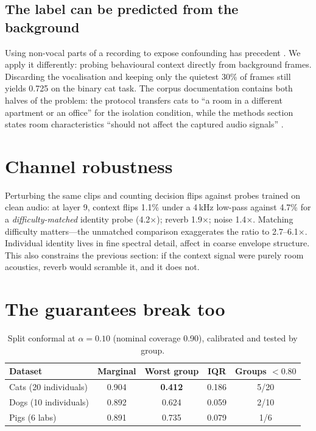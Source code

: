 \documentclass{article}
\begin{document}
\subsection{The label can be predicted from the background}

Using non-vocal parts of a recording to expose confounding has precedent \citep{stowell2019}. We
apply it differently: probing behavioural context directly from background frames. Discarding the
vocalisation and keeping only the quietest 30\% of frames still yields 0.725 on the binary cat task.
The corpus documentation contains both halves of the problem: the protocol transfers cats to ``a room
in a different apartment or an office'' for the isolation condition, while the methods section states
room characteristics ``should not affect the captured audio signals'' \citep{ntalampiras2019}.

\section{Channel robustness}\label{sec:stress}

Perturbing the same clips and counting decision flips against probes trained on clean audio: at layer
9, context flips 1.1\% under a 4\,kHz low-pass against 4.7\% for a \emph{difficulty-matched} identity
probe (4.2$\times$); reverb 1.9$\times$; noise 1.4$\times$. Matching difficulty matters---the
unmatched comparison exaggerates the ratio to 2.7--6.1$\times$. Individual identity lives in fine
spectral detail, affect in coarse envelope structure. This also constrains the previous section: if
the context signal were purely room acoustics, reverb would scramble it, and it does not.

\section{The guarantees break too}\label{sec:conformal}

\begin{table}[t]
\caption{Split conformal at $\alpha{=}0.10$ (nominal coverage 0.90), calibrated and tested by group.}
\label{tab:conformal}
\centering\small
\begin{tabular}{lcccc}
\toprule
Dataset & Marginal & Worst group & IQR & Groups $<0.80$ \\
\midrule
Cats (20 individuals) & 0.904 & \textbf{0.412} & 0.186 & 5/20 \\
Dogs (10 individuals) & 0.892 & 0.624 & 0.059 & 2/10 \\
Pigs (6 labs) & 0.891 & 0.735 & 0.079 & 1/6 \\
\bottomrule
\end{tabular}
\end{table}
\end{document}
